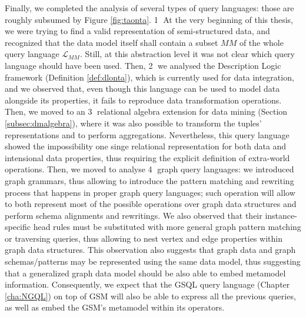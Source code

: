 Finally, we completed the analysis of several types of query languages: those are roughly subsumed by Figure \ref{fig:taonta}. \textcircled{\raisebox{-.5pt}1} At the very beginning of this thesis, we were trying to find a valid  representation of semi-structured data, and recognized that the data model itself shall contain a subset $MM$ of the whole query language $\mathcal{L}_{MM}$. Still, at this abstraction level it was not clear which query language should have been used. Then, \textcircled{\raisebox{-.5pt}2} we analysed the Description Logic framework (Definition \vref{def:dlonta}), which is currently used for data integration, and we observed that, even though this language can be used to model data alongside its properties, it fails to reproduce data transformation operations. Then, we moved to an  \textcircled{\raisebox{-.5pt}3} relational algebra extension for data mining (Section \vref{subsec:dmalgebra}), where it was also possible to transform the tuples' representations and to perform aggregations. Nevertheless, this query language showed the impossibility one singe relational representation for both data and intensional data properties, thus requiring the explicit definition of extra-world operations. Then, we moved to analyse \textcircled{\raisebox{-.5pt}4} graph query languages: we  introduced graph grammars, thus allowing to introduce the pattern matching and rewriting process that happens in proper graph query languages; such operation will allow to both represent most of the possible operations over graph data structures and perform schema alignments and rewritings. We also observed that their instance-specific head rules must be substituted with more general graph pattern matching or traversing queries, thus allowing to nest vertex and edge properties within graph data structures. This observation also suggests that graph data and graph schemas/patterns may be represented using the same data model, thus suggesting that a generalized graph data model should be also able to embed metamodel information. Consequently, we expect that the GSQL query language (Chapter \ref{cha:NGQL}) on top of GSM will also be able to express all the previous queries, as well as embed the GSM's metamodel within its operators.



